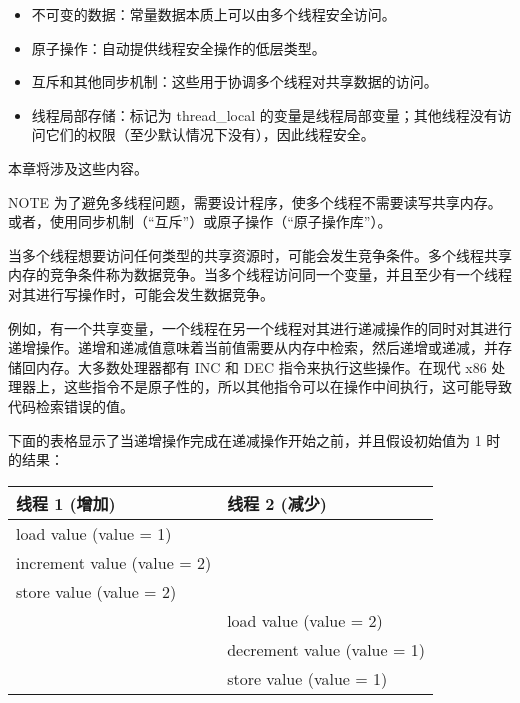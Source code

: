 \begin{itemize}
\item
不可变的数据：常量数据本质上可以由多个线程安全访问。

\item
原子操作：自动提供线程安全操作的低层类型。

\item
互斥和其他同步机制：这些用于协调多个线程对共享数据的访问。

\item
线程局部存储：标记为 thread\_local 的变量是线程局部变量；其他线程没有访问它们的权限（至少默认情况下没有），因此线程安全。
\end{itemize}

本章将涉及这些内容。

\begin{myNotic}{NOTE}
为了避免多线程问题，需要设计程序，使多个线程不需要读写共享内存。或者，使用同步机制（“互斥”）或原子操作（“原子操作库”）。
\end{myNotic}


当多个线程想要访问任何类型的共享资源时，可能会发生竞争条件。多个线程共享内存的竞争条件称为数据竞争。当多个线程访问同一个变量，并且至少有一个线程对其进行写操作时，可能会发生数据竞争。

例如，有一个共享变量，一个线程在另一个线程对其进行递减操作的同时对其进行递增操作。递增和递减值意味着当前值需要从内存中检索，然后递增或递减，并存储回内存。大多数处理器都有 INC 和 DEC 指令来执行这些操作。在现代 x86 处理器上，这些指令不是原子性的，所以其他指令可以在操作中间执行，这可能导致代码检索错误的值。

下面的表格显示了当递增操作完成在递减操作开始之前，并且假设初始值为 1 时的结果：

\begin{longtable}{|l|l|}
\hline
\textbf{线程 1 (增加)} & \textbf{线程 2 (减少)} \\ \hline
\endfirsthead
%
\endhead
%
load value (value = 1)        &                               \\ \hline
increment value (value = 2)   &                               \\ \hline
store value (value = 2)       &                               \\ \hline
& load value (value = 2)        \\ \hline
& decrement value (value = 1)   \\ \hline
& store value (value = 1)       \\ \hline
\end{longtable}

